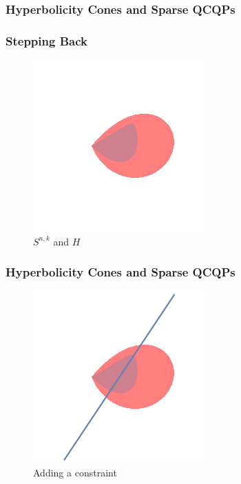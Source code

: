 \documentclass{beamer}
\begin{document}
\begin{frame}
    \frametitle{Hyperbolicity Cones and Sparse QCQPs}
    \frametitle{Stepping Back}
    \begin{figure}[h]
        \centering
        \includegraphics[width=0.6\linewidth]{comparison.png}
        \caption{$S^{n,k}$ and $H$}%
        \label{fig:just_snk}
    \end{figure}
\end{frame}
\begin{frame}
    \frametitle{Hyperbolicity Cones and Sparse QCQPs}
    \begin{figure}[htpb]
        \centering
        \includegraphics[width=0.6\linewidth]{comparison_line.png}
        \caption{Adding a constraint}%
        \label{fig:comparison_line}
    \end{figure}
\end{frame}
\end{document}

